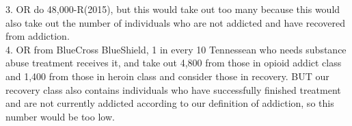 \documentclass[12pt]{article}
\begin{document}
3. \noindent OR do 48,000-R(2015), but this would take out too many because this would also take out the number of individuals who are not addicted and have recovered from addiction. \\

4. \noindent OR from BlueCross BlueShield, 1 in every 10 Tennessean who needs substance abuse treatment receives it, and take out 4,800 from those in opioid addict class and 1,400 from those in heroin class and consider those in recovery. BUT our recovery class also contains individuals who have successfully finished treatment and are not currently addicted according to our definition of addiction, so this number would be too low.   \\ %


\end{document}
